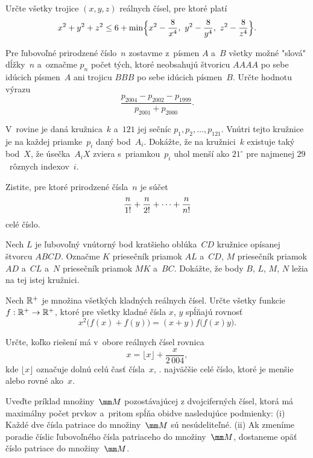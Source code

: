 {%
Určte všetky trojice $(x,y,z)$ reálnych čísel, pre
ktoré platí
$$
x^2+y^2+z^2\leq 6+\min\Bigl\{x^2-\frac{8}{x^4},\
      y^2-\frac{8}{y^4},\ z^2-\frac{8}{z^4}\Bigr\}.
$$}

{%
Pre ľubovoľné prirodzené číslo~$n$ zostavme z~písmen $A$ a~$B$
všetky možné "slová" dĺžky~$n$ a~označme $p_n$ počet tých,
ktoré neobsahujú štvoricu $AAAA$ po sebe idúcich
písmen~$A$ ani trojicu $BBB$ po sebe idúcich písmen~$B$. Určte
hodnotu výrazu
$$
\frac{p_{2004}-p_{2002}-p_{1999}}{p_{2001}+p_{2000}}.
$$}

{%
V~rovine je daná kružnica~$k$ a~$121$ jej sečníc
$p_1,p_2,\dots,p_{121}$. Vnútri tejto kružnice je na každej
priamke~$p_i$ daný bod~$A_i$. Dokážte, že na kružnici~$k$ existuje
taký bod~$X$, že úsečka~$A_iX$ zviera s~priamkou~$p_i$ uhol menší
ako $21^{\circ}$ pre najmenej $29$~rôznych indexov~$i$.}

{%
Zistite, pre ktoré prirodzené čísla~$n$ je súčet
$$
{n\over1!}+{n\over2!}+\dots+{n\over n!}
$$
celé číslo.}

{%
Nech $L$ je ľubovoľný vnútorný bod kratšieho oblúka~$CD$ kružnice
opísanej štvorcu $ABCD$. Označme $K$ priesečník priamok $AL$ a~$CD$,
$M$ priesečník priamok $AD$ a~$CL$ a~$N$ priesečník priamok $MK$
a~$BC$. Dokážte, že body $B$, $L$, $M$, $N$ ležia na tej istej
kružnici.}

{%
Nech $\Bbb R^+$ je množina všetkých kladných reálnych čísel.
Určte všetky funkcie $f:\Bbb R^{+} \to \Bbb R^{+}$, ktoré
pre všetky kladné čísla $x$, $y$ spĺňajú rovnosť
$$
x^2\bigl(f(x)+f(y)\bigr)=(x+y)f\bigl(f(x)y\bigr).
$$}

{%
Určte, koľko riešení má v~obore reálnych čísel rovnica
$$
x=\lfloor x\rfloor+\frac{x}{2\,004},
$$
kde $\lfloor x\rfloor$ označuje dolnú celú časť čísla~$x$, \tj. najväčšie celé číslo, ktoré
je menšie alebo rovné ako~$x$.}

{%
Uveďte príklad množiny~$\mm M$ pozostávajúcej z dvojciferných čísel, ktorá má
maximálny počet prvkov a~pritom spĺňa obidve nasledujúce podmienky:
\ite (i) Každé dve čísla patriace do množiny~$\mm M$ sú nesúdeliteľné.
\ite (ii) Ak zmeníme poradie číslic ľubovoľného čísla patriaceho do množiny~$\mm M$,
dostaneme opäť číslo patriace do množiny~$\mm M$.

}


